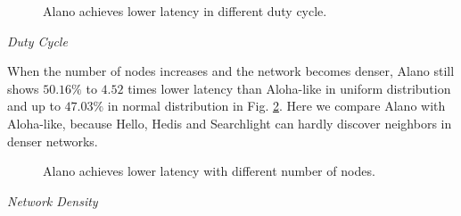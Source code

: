 \begin{figure}[!h]
\centering
{}
\hspace{0.01in}
\caption{Alano achieves lower latency in different duty cycle.}
\label{fig_dutycycle}
\end{figure}

\emph{Duty Cycle} 




When the number of nodes increases and the network becomes denser, Alano still shows $50.16\%$ to $4.52$ times lower latency than Aloha-like in uniform distribution and up to $47.03\%$ in normal distribution in Fig. \ref{fig_node}. Here we compare Alano with Aloha-like, because Hello, Hedis and Searchlight can hardly discover neighbors in denser networks. 

\begin{figure}[!h]
\centering
{}
\hspace{0.01in}
\caption{Alano achieves lower latency with different number of nodes.}
\label{fig_node}
\end{figure}

\emph{Network Density} 


